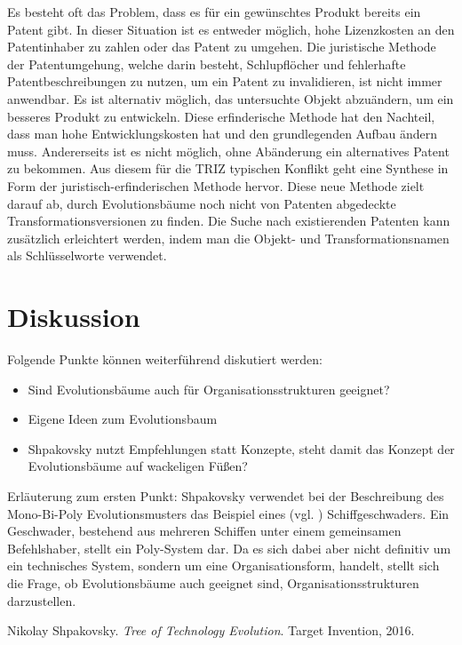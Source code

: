 \documentclass[11pt,a4paper]{article}
\begin{document}
Es besteht oft das Problem, dass es für ein gewünschtes Produkt bereits ein
Patent gibt. In dieser Situation ist es entweder möglich, hohe Lizenzkosten an
den Patentinhaber zu zahlen oder das Patent zu umgehen.  Die juristische
Methode der Patentumgehung, welche darin besteht, Schlupflöcher und
fehlerhafte Patentbeschreibungen zu nutzen, um ein Patent zu invalidieren, ist
nicht immer anwendbar.  Es ist alternativ möglich, das untersuchte Objekt
abzuändern, um ein besseres Produkt zu entwickeln. Diese erfinderische Methode
hat den Nachteil, dass man hohe Entwicklungskosten hat und den grundlegenden
Aufbau ändern muss. Andererseits ist es nicht möglich, ohne Abänderung ein
alternatives Patent zu bekommen.  Aus diesem für die TRIZ typischen Konflikt
geht eine Synthese in Form der juristisch-erfinderischen Methode hervor. Diese
neue Methode zielt darauf ab, durch Evolutionsbäume noch nicht von Patenten
abgedeckte Transformationsversionen zu finden.  Die Suche nach existierenden
Patenten kann zusätzlich erleichtert werden, indem man die Objekt- und
Transformationsnamen als Schlüsselworte verwendet.

\section{Diskussion}

Folgende Punkte können weiterführend diskutiert werden:
\begin{itemize}[noitemsep]
\item Sind Evolutionsbäume auch für Organisationsstrukturen geeignet?
\item Eigene Ideen zum Evolutionsbaum
\item Shpakovsky nutzt Empfehlungen statt Konzepte, steht damit das Konzept
  der Evolutionsbäume auf wackeligen Füßen?
\end{itemize}

Erläuterung zum ersten Punkt: Shpakovsky verwendet bei der Beschreibung des
Mono-Bi-Poly Evolutionsmusters das Beispiel eines (vgl. \cite[S. 77]{evo})
Schiffgeschwaders. Ein Geschwader, bestehend aus mehreren Schiffen unter einem
gemeinsamen Befehlshaber, stellt ein Poly-System dar. Da es sich dabei aber
nicht definitiv um ein technisches System, sondern um eine Organisationsform,
handelt, stellt sich die Frage, ob Evolutionsbäume auch geeignet sind, 
Organisationsstrukturen darzustellen.


%
\begin{thebibliography}{xx}
 Nikolay Shpakovsky. \emph{Tree of Technology Evolution}. Target
  Invention, 2016.
\end{thebibliography}
\end{document}
